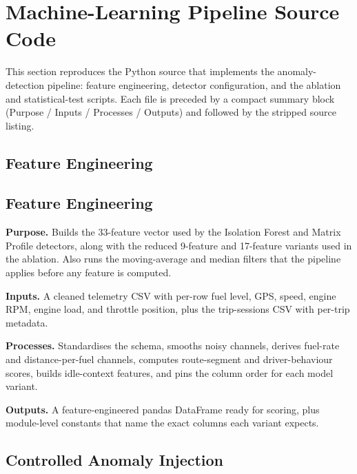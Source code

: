 \section{Machine-Learning Pipeline Source Code}
\label{sec:app_ml_code}

This section reproduces the Python source that implements the anomaly-detection pipeline: feature engineering, detector configuration, and the ablation and statistical-test scripts. Each file is preceded by a compact summary block (Purpose / Inputs / Processes / Outputs) and followed by the stripped source listing.

\subsection*{Feature Engineering}

\subsection{Feature Engineering}
\label{sec:code_preprocess}

\noindent\textbf{Purpose.} Builds the 33-feature vector used by the Isolation Forest and Matrix Profile detectors, along with the reduced 9-feature and 17-feature variants used in the ablation. Also runs the moving-average and median filters that the pipeline applies before any feature is computed.

\noindent\textbf{Inputs.} A cleaned telemetry CSV with per-row fuel level, GPS, speed, engine RPM, engine load, and throttle position, plus the trip-sessions CSV with per-trip metadata.

\noindent\textbf{Processes.} Standardises the schema, smooths noisy channels, derives fuel-rate and distance-per-fuel channels, computes route-segment and driver-behaviour scores, builds idle-context features, and pins the column order for each model variant.

\noindent\textbf{Outputs.} A feature-engineered pandas DataFrame ready for scoring, plus module-level constants that name the exact columns each variant expects.



\subsection{Controlled Anomaly Injection}
\label{sec:code_inject_anomalies}

